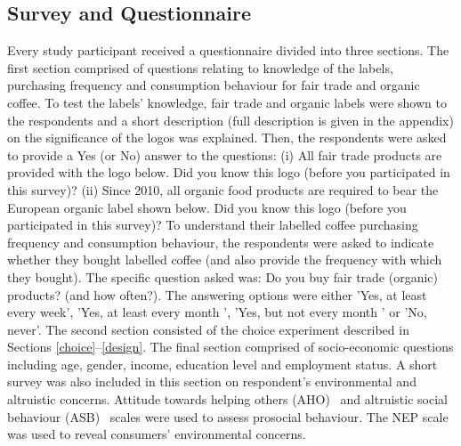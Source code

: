 \documentclass[sustainability,article,accept,moreauthors,pdftex,10pt,a4paper]{Definitions/mdpi}
\theoremstyle{mdpi}
\newcounter{ex}
\newcounter{re}
\theoremstyle{mdpidefinition}
\begin{document}
\subsection{Survey and Questionnaire}
\par{Every study participant received a questionnaire divided into three sections. The first section comprised of questions relating to knowledge of the labels, purchasing frequency and consumption behaviour for fair trade and organic coffee. To test the labels' knowledge, fair trade and organic labels were shown to the respondents and a short description (full description is given in the appendix) on the significance of the logos was explained. Then, the respondents were asked to provide a Yes (or No) answer to the questions: (i) All fair trade products are provided with the logo below. Did you know this logo (before you participated in this survey)? (ii) Since 2010, all organic food products are required to bear the European organic label shown below.  Did you know this logo (before you participated in this survey)? To understand their labelled coffee purchasing frequency and consumption behaviour, the respondents were asked to indicate whether they bought labelled coffee (and also provide the frequency with which they bought). The specific question asked was: Do you buy fair trade (organic) products? (and how often?). The answering options were either 'Yes, at least every week', 'Yes, at least every month ', 'Yes, but not every month ' or 'No, never'. The second section consisted of the choice experiment described in Sections \ref{choice}--\ref{design}. The final section comprised of socio-economic questions including age, gender, income, education level and employment status. A short survey was also included in this section on respondent's environmental and altruistic concerns. Attitude towards helping others (AHO)~\cite{Webb2000} and altruistic social behaviour (ASB)~\cite{carlo2002, carlo2003} scales were used to assess prosocial behaviour. The NEP scale~\cite{Dunlap2000} was used to reveal consumers' environmental concerns.
}
\end{document}
